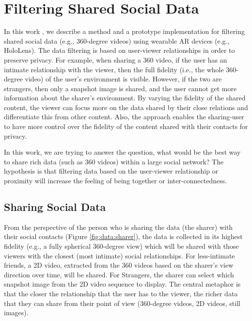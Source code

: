 \section{Filtering Shared Social Data}
\label{sec:surrounding:360}

In this work \cite{Nassani2018a}, we describe a method and a prototype implementation for filtering shared social data (e.g., 360-degree videos) using wearable AR devices (e.g., HoloLens). The data filtering is based on user-viewer relationships in order to preserve privacy. For example, when sharing a 360 video, if the user has an intimate relationship with the viewer, then the full fidelity (i.e., the whole 360-degree video) of the user's environment is visible. However, if the two are strangers, then only a snapshot image is shared, and the user cannot get more information about the sharer's environment. By varying the fidelity of the shared content, the viewer can focus more on the data shared by their close relations and differentiate this from other content. Also, the approach enables the sharing-user to have more control over the fidelity of the content shared with their contacts for privacy.

In this work, we are trying to answer the question, what would be the best way to share rich data (such as 360 videos) within a large social network? The hypothesis is that filtering data based on the user-viewer relationship or proximity will increase the feeling of being together or inter-connectedness. 


\subsection{Sharing Social Data}

From the perspective of the person who is sharing the data (the sharer) with their social contacts (Figure \ref{fig:data:sharer}), the data is collected in its highest fidelity (e.g., a fully spherical 360-degree view) which will be shared with those viewers with the closest (most intimate) social relationships. For less-intimate friends, a 2D video, extracted from the 360 videos based on the sharer's view direction over time, will be shared. For Strangers, the sharer can select which snapshot image from the 2D video sequence to display. The central metaphor is that the closer the relationship that the user has to the viewer, the richer data that they can share from their point of view (360-degree videos, 2D videos, still images).

